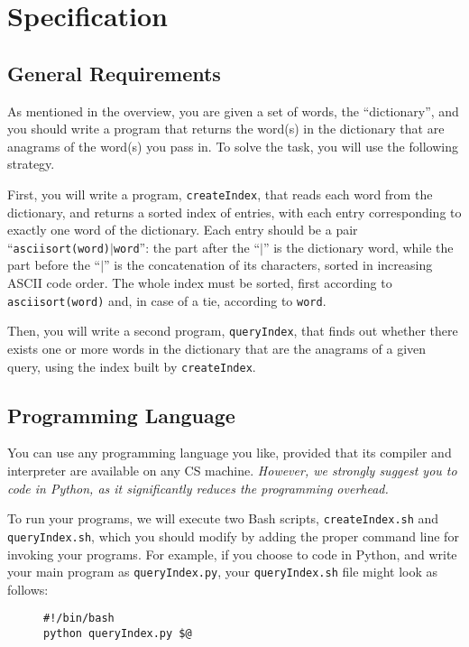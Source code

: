 \documentclass[10pt]{article}
\newcommand{\file}[1]{\texttt{#1}}
\newcommand{\code}[1]{\texttt{#1}}
\begin{document}
\section{Specification}
\label{spec}

\subsection{General Requirements}
\label{general}

As mentioned in the overview,
you are given a set of words,
the ``dictionary'',
and you should write a program that
returns the word(s) in the dictionary
that are anagrams of the word(s) you pass in.
To solve the task, you will use the following strategy.

First, you will write a program,
\file{createIndex},
that reads each word from the dictionary,
and returns a sorted index of entries,
with each entry corresponding
to exactly one word of the dictionary.
Each entry should be a pair ``\code{asciisort(word)$|$word}'':
the part after the ``\code{$|$}'' is the dictionary word,
while the part before the ``\code{$|$}'' is
the concatenation of its characters,
sorted in increasing ASCII code order.
The whole index must be sorted,
first according to \code{asciisort(word)}
and, in case of a tie, according to \code{word}.

Then, you will write a second program,
\file{queryIndex},
that finds out whether there exists
one or more words in the dictionary
that are the anagrams of a given query,
using the index built by
\file{createIndex}.

\subsection{Programming Language}
\label{language}

You can use any programming language you like,
provided that its compiler and interpreter
are available on any CS machine.
\emph{However, we strongly suggest you to code in Python,
as it significantly reduces the programming overhead.}

To run your programs,
we will execute two Bash scripts,
\file{createIndex.sh} and \file{queryIndex.sh},
which you should modify by
adding the proper command line for invoking your programs.
For example, if you choose to code in Python,
and write your main program as \file{queryIndex.py},
your \file{queryIndex.sh} file might look as follows:
\begin{figure}[ht]
\begin{Verbatim}
#!/bin/bash
python queryIndex.py $@
\end{Verbatim}
\label{fig:queryIndex}
\end{figure}
\end{document}
